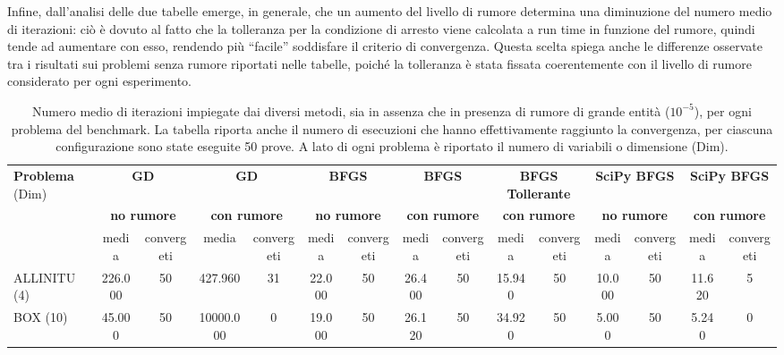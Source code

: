 Infine, dall’analisi delle due tabelle emerge, in generale, che un aumento del livello di rumore determina una diminuzione del numero medio di iterazioni: ciò è dovuto al fatto che la tolleranza per la condizione di arresto viene calcolata a run time in funzione del rumore, quindi tende ad aumentare con esso, rendendo più “facile” soddisfare il criterio di convergenza. Questa scelta spiega anche le differenze osservate tra i risultati sui problemi senza rumore riportati nelle tabelle, poiché la tolleranza è stata fissata coerentemente con il livello di rumore considerato per ogni esperimento.

\begin{table}
    \scriptsize
    \caption{Numero medio di iterazioni impiegate dai diversi metodi, sia in assenza che in presenza di rumore di grande entità (\(10^{-5}\)), per ogni problema del benchmark. La tabella riporta anche il numero di esecuzioni che hanno effettivamente raggiunto la convergenza, per ciascuna configurazione sono state eseguite 50 prove. A lato di ogni problema è riportato il numero di variabili o dimensione (Dim).}\label{tab:iterazioni_rumore_grande}
    \centering
    \begin{tabular}{lcccccccccccccc}
    \toprule
    \multirow{2}{*}{\textbf{Problema} (Dim)} & \multicolumn{2}{c}{\textbf{GD}} & \multicolumn{2}{c}{\textbf{GD}} & \multicolumn{2}{c}{\textbf{BFGS}} & \multicolumn{2}{c}{\textbf{BFGS}} & \multicolumn{2}{c}{\textbf{BFGS Tollerante}} & \multicolumn{2}{c}{\textbf{SciPy BFGS}} & \multicolumn{2}{c}{\textbf{SciPy BFGS}} \\
                                       & \multicolumn{2}{c}{\textbf{no rumore}} & \multicolumn{2}{c}{\textbf{con rumore}} & \multicolumn{2}{c}{\textbf{no rumore}} & \multicolumn{2}{c}{\textbf{con rumore}} & \multicolumn{2}{c}{\textbf{con rumore}} & \multicolumn{2}{c}{\textbf{no rumore}} & \multicolumn{2}{c}{\textbf{con rumore}} \\
                                       & media & convergeti & media & convergeti & media & convergeti & media & convergeti & media & convergeti & media & convergeti & media & convergeti \\
    \midrule
    ALLINITU (4)  & 226.000   & 50 & 427.960   & 31 & 22.000  & 50 & 26.400    & 50 & 15.940  & 50 & 10.000  & 50 & 11.620  & 5 \\[1ex]
    BOX (10)      & 45.000    & 50 & 10000.000 & 0  & 19.000  & 50 & 26.120    & 50 & 34.920  & 50 & 5.000   & 50 & 5.240   & 0 \\[1ex]

\end{tabular}
\end{table}
